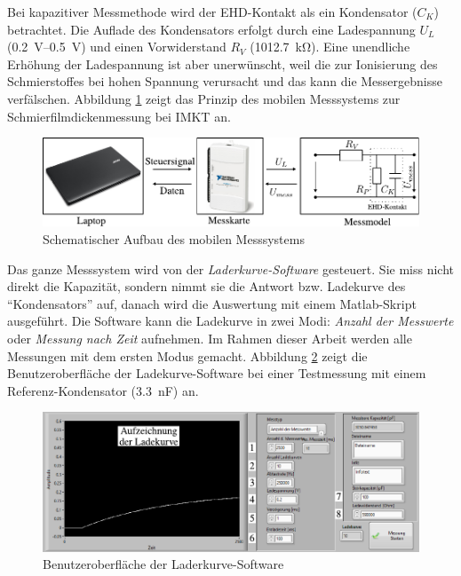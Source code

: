 Bei kapazitiver Messmethode wird der EHD-Kontakt als ein Kondensator ($C_K$) betrachtet.
Die Auflade des Kondensators erfolgt durch eine Ladespannung $U_L$ (\SIrange{0,2}{0,5}{\volt}) und einen Vorwiderstand $R_V$ (\SI{1012.7}{\kilo\ohm}).
Eine unendliche Erhöhung der Ladespannung ist aber unerwünscht, weil die zur Ionisierung des Schmierstoffes bei hohen Spannung verursacht und das kann die Messergebnisse verfälschen.
Abbildung \ref{fig:Schematischer_aufbau_des_mobilen_messsystems} zeigt das Prinzip des mobilen Messsystems zur Schmierfilmdickenmessung bei IMKT an.
\begin{figure}[htb]
    \centering
    \includegraphics[]{./images/schematischer_aufbau_des_mobilen_messsystem.pdf}
    \caption{Schematischer Aufbau des mobilen Messsystems}
    \label{fig:Schematischer_aufbau_des_mobilen_messsystems}
\end{figure}

Das ganze Messsystem wird von der \textit{Laderkurve-Software} gesteuert.
Sie miss nicht direkt die Kapazität, sondern nimmt sie die Antwort bzw. Ladekurve des ``Kondensators'' auf, danach wird die Auswertung mit einem Matlab-Skript ausgeführt.
Die Software kann die Ladekurve in zwei Modi: \emph{Anzahl der Messwerte} oder \emph{Messung nach Zeit} aufnehmen.
Im Rahmen dieser Arbeit werden alle Messungen mit dem ersten Modus gemacht.
Abbildung \ref{fig:gui_der_laderkurve_software} zeigt die Benutzeroberfläche der Ladekurve-Software bei einer Testmessung mit einem Referenz-Kondensator (\SI{3.3}{\nano\farad}) an.
\begin{figure}[htb]
    \centering
    \includegraphics[]{./images/ladekurven_gui.pdf}
    \caption{Benutzeroberfläche der Laderkurve-Software}
    \label{fig:gui_der_laderkurve_software}
\end{figure}

